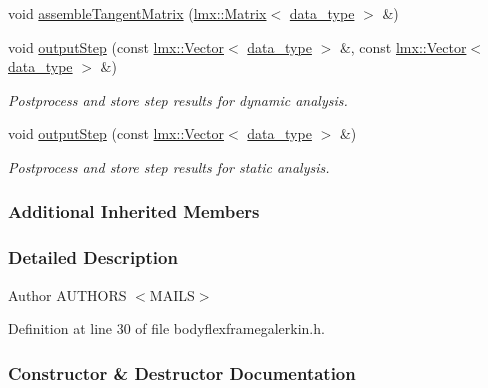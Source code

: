 \begin{DoxyCompactItemize}
\item 
void \hyperlink{classmknix_1_1_flex_frame_galerkin_ab7f2e487dd295e1bb1bf27105fc598c1}{assemble\+Tangent\+Matrix} (\hyperlink{classlmx_1_1_matrix}{lmx\+::\+Matrix}$<$ \hyperlink{namespacemknix_a16be4b246fbf2cceb141e3a179111020}{data\+\_\+type} $>$ \&)
\item 
void \hyperlink{classmknix_1_1_flex_frame_galerkin_ae3f612bf542ac40c5a3d531760f12edd}{output\+Step} (const \hyperlink{classlmx_1_1_vector}{lmx\+::\+Vector}$<$ \hyperlink{namespacemknix_a16be4b246fbf2cceb141e3a179111020}{data\+\_\+type} $>$ \&, const \hyperlink{classlmx_1_1_vector}{lmx\+::\+Vector}$<$ \hyperlink{namespacemknix_a16be4b246fbf2cceb141e3a179111020}{data\+\_\+type} $>$ \&)
\begin{DoxyCompactList}\small\item\em Postprocess and store step results for dynamic analysis. \end{DoxyCompactList}\item 
void \hyperlink{classmknix_1_1_flex_frame_galerkin_adc9bc8c1c277474fe2f62b49883c790a}{output\+Step} (const \hyperlink{classlmx_1_1_vector}{lmx\+::\+Vector}$<$ \hyperlink{namespacemknix_a16be4b246fbf2cceb141e3a179111020}{data\+\_\+type} $>$ \&)
\begin{DoxyCompactList}\small\item\em Postprocess and store step results for static analysis. \end{DoxyCompactList}\end{DoxyCompactItemize}
\subsubsection*{Additional Inherited Members}


\subsubsection{Detailed Description}
\begin{DoxyAuthor}{Author}
A\+U\+T\+H\+O\+R\+S $<$\+M\+A\+I\+L\+S$>$ 
\end{DoxyAuthor}


Definition at line 30 of file bodyflexframegalerkin.\+h.



\subsubsection{Constructor \& Destructor Documentation}
\hypertarget{classmknix_1_1_flex_frame_galerkin_a75d7ddbbdfa42764f60fee7bfb3655c8}{}
